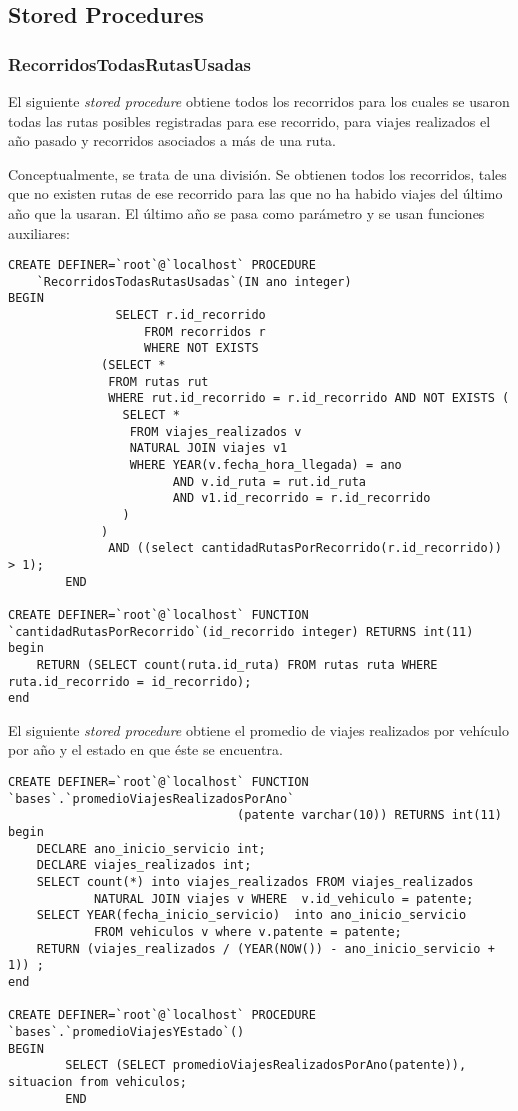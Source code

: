 \subsection{Stored Procedures}

\subsubsection*{RecorridosTodasRutasUsadas}


El siguiente \textit{stored procedure} obtiene todos los recorridos para los cuales se usaron todas las rutas posibles registradas para ese  recorrido, para viajes realizados el año pasado y recorridos asociados a más de una ruta.

Conceptualmente, se trata de una divisi\'on. Se obtienen todos los recorridos, tales que no existen rutas de ese recorrido para las que no ha habido viajes del \'ultimo a\~no que la usaran. El \'ultimo año se pasa como par\'ametro y se usan funciones auxiliares:

\begin{verbatim}
CREATE DEFINER=`root`@`localhost` PROCEDURE  
	`RecorridosTodasRutasUsadas`(IN ano integer)
BEGIN
		       SELECT r.id_recorrido
	       	       FROM recorridos r
	       	       WHERE NOT EXISTS
			 (SELECT *
			  FROM rutas rut
			  WHERE rut.id_recorrido = r.id_recorrido AND NOT EXISTS (
				SELECT *
				 FROM viajes_realizados v
				 NATURAL JOIN viajes v1
				 WHERE YEAR(v.fecha_hora_llegada) = ano
				       AND v.id_ruta = rut.id_ruta
				       AND v1.id_recorrido = r.id_recorrido
				) 
			 )			
		      AND ((select cantidadRutasPorRecorrido(r.id_recorrido)) > 1);
		END
		
CREATE DEFINER=`root`@`localhost` FUNCTION  
`cantidadRutasPorRecorrido`(id_recorrido integer) RETURNS int(11)
begin
    RETURN (SELECT count(ruta.id_ruta) FROM rutas ruta WHERE ruta.id_recorrido = id_recorrido);
end
\end{verbatim}

El siguiente \textit{stored procedure} obtiene el promedio de viajes realizados por veh\'iculo por a\~no y el estado en que \'este se encuentra.

\begin{verbatim}
CREATE DEFINER=`root`@`localhost` FUNCTION  `bases`.`promedioViajesRealizadosPorAno`
								(patente varchar(10)) RETURNS int(11)
begin
    DECLARE ano_inicio_servicio int;
    DECLARE viajes_realizados int;
    SELECT count(*) into viajes_realizados FROM viajes_realizados 
    		NATURAL JOIN viajes v WHERE  v.id_vehiculo = patente;
    SELECT YEAR(fecha_inicio_servicio)  into ano_inicio_servicio 
    		FROM vehiculos v where v.patente = patente;
    RETURN (viajes_realizados / (YEAR(NOW()) - ano_inicio_servicio + 1)) ;
end

CREATE DEFINER=`root`@`localhost` PROCEDURE  `bases`.`promedioViajesYEstado`()
BEGIN
		SELECT (SELECT promedioViajesRealizadosPorAno(patente)), situacion from vehiculos;
		END
		
		
\end{verbatim}

